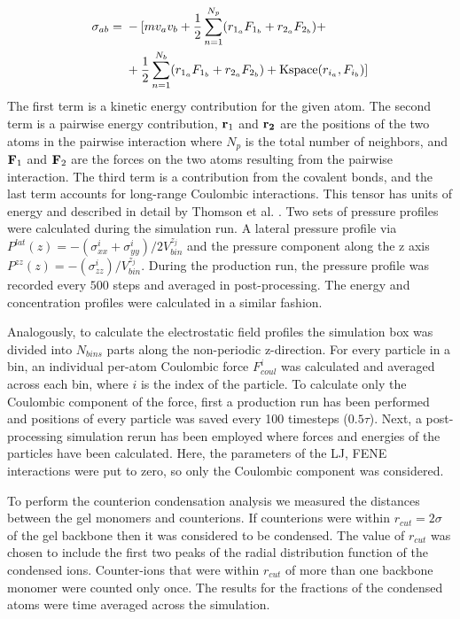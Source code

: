 \documentclass[twoside,twocolumn,9pt]{article}
\begin{document}
\begin{align}
\begin{split}\label{eq:stress_atom}
    \sigma_{ab} ={}& - [ m v_a v_b +
          \frac{1}{2} \sum_{n = 1}^{N_p} (r_{1_a} F_{1_b} + r_{2_a} F_{2_b}) + \\
         & + \frac{1}{2} \sum_{n = 1}^{N_b} (r_{1_a} F_{1_b} + r_{2_a} F_{2_b}) + 
          {\rm Kspace}(r_{i_a},F_{i_b}) ]
\end{split}
\end{align}
The first term is a kinetic energy contribution for the given atom. The second term is a pairwise energy contribution, ${\bf r}_1$ and $\bf{r}_2$ are the positions of the two atoms in the pairwise interaction where $N_p$ is the total number of neighbors, and ${\bf F}_1$ and ${\bf F}_2$ are the forces on the two atoms resulting from the pairwise interaction. The third term is a contribution from the covalent bonds, and the last term accounts for long-range Coulombic interactions. This tensor has units of energy and described in detail by Thomson et al. \citep{thompson2009general}. Two sets of pressure profiles were calculated during the simulation run. A lateral pressure profile via $P^{lat}(z)=-( \sigma_{xx}^i + \sigma_{yy}^i)/ 2V^{z_j}_{bin}$ and the pressure component along the z axis $P^{zz}(z)=-(\sigma_{zz}^i)/ V^{z_j}_{bin}$. During the production run, the pressure profile was recorded every $500$ steps and averaged in post-processing. The energy and concentration profiles were calculated in a similar fashion.

Analogously, to calculate the electrostatic field profiles the simulation box was divided into $N_{bins}$ parts along the non-periodic z-direction. For every particle in a bin, an individual per-atom Coulombic force $F^i_{coul}$ was calculated and averaged across each bin, where $i$ is the index of the particle. To calculate only the Coulombic component of the force, first a production run has been performed and positions of every particle was saved every 100 timesteps ($0.5\tau$). Next, a post-processing simulation rerun has been employed where forces and energies of the particles have been calculated. Here, the parameters of the LJ, FENE  interactions were put to zero, so only the Coulombic component was considered. 

To perform the counterion condensation analysis we measured the distances between the gel monomers and counterions. If counterions were within $r_{cut} = 2 \sigma$ of the gel backbone then it was considered to be condensed. The value of $r_{cut}$ was chosen to include the first two peaks of the radial distribution function of the condensed ions. Counter-ions that were within $r_{cut}$ of more than one backbone monomer were counted only once. The results for the fractions of the condensed atoms were time averaged across the simulation.
\end{document}
